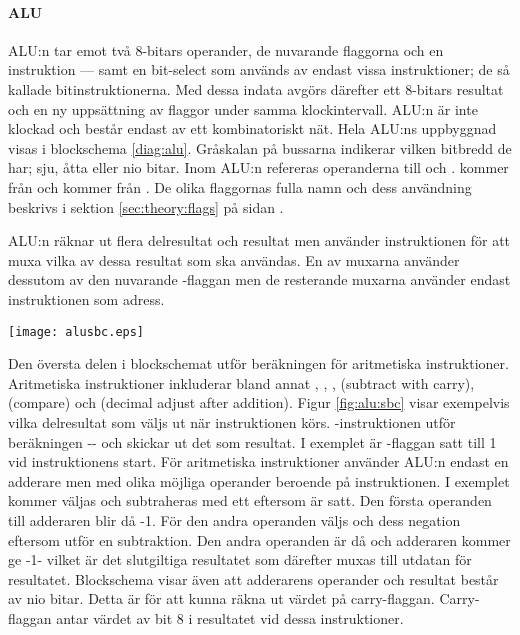 \documentclass[main.tex]{subfiles}
\begin{document}
\paragraph{ALU}
ALU:n tar emot två 8-bitars operander, de nuvarande flaggorna och en
instruktion --- samt en bit-select som används av endast vissa instruktioner;
de så kallade bitinstruktionerna. Med dessa indata avgörs därefter ett 8-bitars
resultat och en ny uppsättning av flaggor under samma klockintervall. ALU:n är
inte klockad och består endast av ett kombinatoriskt nät. Hela ALU:ns
uppbyggnad visas i blockschema \ref{diag:alu}. Gråskalan på bussarna indikerar
vilken bitbredd de har; sju, åtta eller nio bitar. Inom ALU:n refereras
operanderna till  och .  kommer från 
och  kommer från . De olika flaggornas fulla namn och dess
användning beskrivs i sektion \ref{sec:theory:flags} på sidan
\pageref{sec:theory:flags}.

ALU:n räknar ut flera delresultat och resultat men använder 
instruktionen för att muxa vilka av dessa resultat som ska användas. En av
muxarna använder dessutom av den nuvarande -flaggan men de
resterande muxarna använder endast instruktionen som adress.

\begin{SCfigure}
    \centering
    \texttt{[image: alusbc.eps]}
    \caption{Resultat och delresultat som muxas då -instruktionen
    utförs och -flaggan är satt.}
    \label{fig:alu:sbc}
\end{SCfigure}

Den översta delen i blockschemat utför beräkningen för aritmetiska
instruktioner. Aritmetiska instruktioner inkluderar bland annat ,
, ,  (subtract with carry),  (compare)
och  (decimal adjust after addition). Figur \ref{fig:alu:sbc} visar
exempelvis vilka delresultat som väljs ut när instruktionen  körs.
-instruktionen utför beräkningen -- och
skickar ut det som resultat. I exemplet är -flaggan satt till 1 vid
instruktionens start. För aritmetiska instruktioner använder ALU:n endast en
adderare men med olika möjliga operander beroende på instruktionen. I exemplet
kommer  väljas och subtraheras med ett eftersom  är satt. Den
första operanden till adderaren blir då -1. För den andra operanden
väljs  och dess negation eftersom  utför en subtraktion.
Den andra operanden är då  och adderaren kommer ge
-1- vilket är det slutgiltiga resultatet som därefter muxas
till utdatan för resultatet. Blockschema  visar även att
adderarens operander och resultat består av nio bitar. Detta är för att kunna
räkna ut värdet på carry-flaggan. Carry-flaggan antar värdet av bit 8 i
resultatet vid dessa instruktioner.
\end{document}

